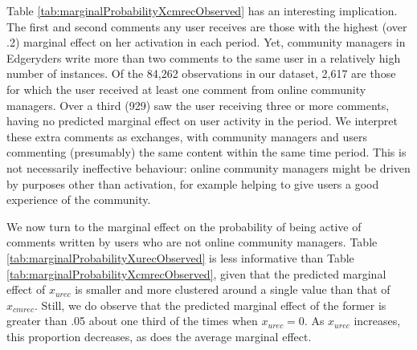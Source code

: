 Table \ref{tab:marginalProbabilityXcmrecObserved} has an interesting implication. The first and second comments any user receives are those with the highest (over .2) marginal effect on her activation in each period. Yet, community managers in Edgeryders write more than two comments to the same user in a relatively high number of instances. Of the 84,262 observations in our dataset, 2,617 are those for which the user received at least one comment from online community managers. Over a third (929) saw the user receiving three or more comments, having no predicted marginal effect on user activity in the period. We interpret these extra comments as exchanges, with community managers and users commenting (presumably) the same content within the same time period. This is not necessarily ineffective behaviour: online community managers might be driven by purposes other than activation, for example helping to give users a good experience of the community.  

We now turn to the marginal effect on the probability of being active of comments written by users who are not online community managers. Table \ref{tab:marginalProbabilityXurecObserved} is less informative than Table \ref{tab:marginalProbabilityXcmrecObserved}, given that the predicted marginal effect of $x_{urec}$ is smaller and more clustered around a single value than that of $x_{cmrec}$. Still, we do observe that the predicted marginal effect of the former is greater than .05 about one third of the times when $x_{urec} = 0$. As $x_{urec}$ increases, this proportion decreases, as does the average marginal effect.

